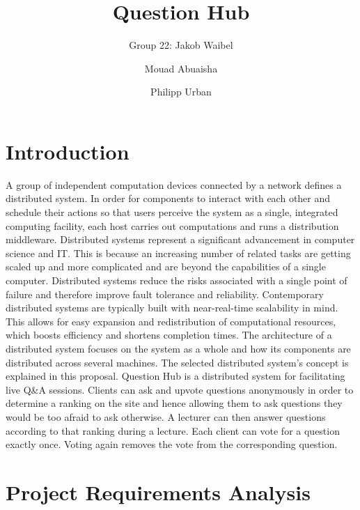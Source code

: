 \documentclass[runningheads]{llncs}
\begin{document}
\title{Question Hub}

\author{Group 22: Jakob Waibel \and Mouad Abuaisha \and Philipp Urban}

\institute{}
\maketitle              

\section{Introduction}

A group of independent computation devices connected by a network defines a
distributed system. In order for components to interact with each other and
schedule their actions so that users perceive the system as a single,
integrated computing facility, each host carries out computations and runs a
distribution middleware\cite{coulouris2005distributed}. Distributed systems
represent a significant advancement in computer science and IT. This is because
an increasing number of related tasks are getting scaled up and more
complicated and are beyond the capabilities of a single computer. Distributed
systems reduce the risks associated with a single point of failure and
therefore improve fault tolerance and reliability. Contemporary distributed
systems are typically built with near-real-time scalability in mind. This
allows for easy expansion and redistribution of computational resources, which
boosts efficiency and shortens completion times. The architecture of a 
distributed system focuses on the system as a whole and how its components are
distributed across several machines\cite{tanenbaum2007distributed}.
The selected distributed system's concept is explained in this proposal.
\newline
\newline
Question Hub is a distributed system for facilitating live Q\&A sessions.
Clients can ask and upvote questions anonymously in order to determine a
ranking on the site and hence allowing them to ask questions they would be too
afraid to ask otherwise. A lecturer can then answer questions according to that
ranking during a lecture. Each client can vote for a question exactly once.
Voting again removes the vote from the corresponding question.

\section{Project Requirements Analysis}
\end{document}
